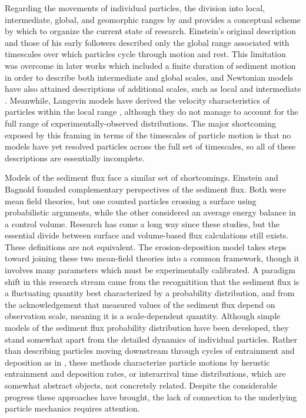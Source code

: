 Regarding the movements of individual particles, the division into local, intermediate, global, and geomorphic ranges by \citet{Nikora2001,Nikora2002} and \citet{Hassan2017} provides a conceptual scheme by which to organize the current state of research.
Einstein's original description \citep{Einstein1937} and those of his early followers \citep{} described only the global range associated with timescales over which particles cycle through motion and rest.
This limitation was overcome in later works which included a finite duration of sediment motion in order to describe both intermediate and global scales, and Newtonian models have also attained descriptions of additional scales, such as local and intermediate \citep{}.
Meanwhile, Langevin models have derived the velocity characteristics of particles within the local range \citep{}, although they do not manage to account for the full range of experimentally-observed distributions.
The major shortcoming exposed by this framing in terms of the timescales of particle motion is that no models have yet resolved particles across the full set of timescales, so all of these descriptions are essentially incomplete.

Models of the sediment flux face a similar set of shortcomings.
Einstein and Bagnold founded complementary perspectives of the sediment flux. Both were mean field theories, but one counted particles crossing a surface using probabilistic arguments, while the other considered an average energy balance in a control volume.
Research has come a long way since these studies, but the essential divide between surface and volume-based flux calculations still exists. These definitions are not equivalent.
The erosion-deposition model takes steps toward joining these two mean-field theories into a common framework, though it involves many parameters which must be experimentally calibrated.
A paradigm shift in this research stream came from the recognitition that the sediment flux is a fluctuating quantity best characterized by a probability distribution, and from the acknowledgement that measured values of the sediment flux depend on observation scale, meaning it is a scale-dependent quantity.
Although simple models of the sediment flux probability distribution have been developed, they stand somewhat apart from the detailed dynamics of individual particles. Rather than describing particles moving downstream through cycles of entrainment and deposition as in \citet{Einstein1937}, these methods characterize particle motions by herustic entrainment and deposition rates, or interarrival time distributions, which are somewhat abstract objects, not concretely related.
Despite the considerable progress these approaches have brought, the lack of connection to the underlying particle mechanics requires attention.





